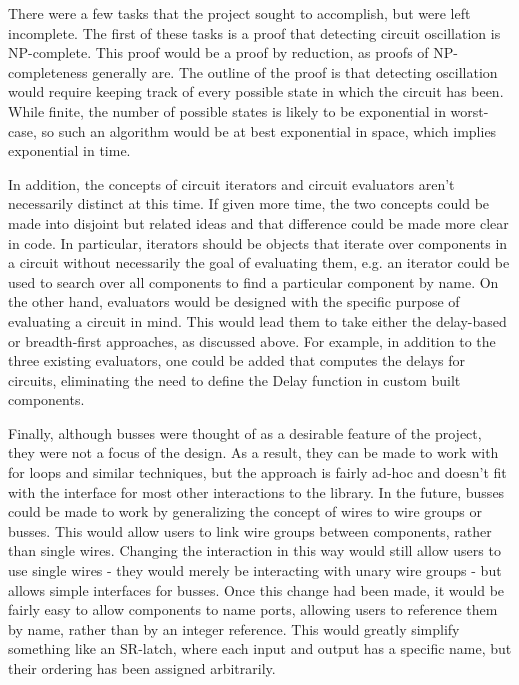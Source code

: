 \documentclass{article}
\begin{document}
There were a few tasks that the project sought to accomplish, but were left incomplete. The first of these tasks is a proof that detecting circuit oscillation is NP-complete. This proof would be a proof by reduction, as proofs of NP-completeness generally are. The outline of the proof is that detecting oscillation would require keeping track of every possible state in which the circuit has been. While finite, the number of possible states is likely to be exponential in worst-case, so such an algorithm would be at best exponential in space, which implies exponential in time.

In addition, the concepts of circuit iterators and circuit evaluators aren’t necessarily distinct at this time. If given more time, the two concepts could be made into disjoint but related ideas and that difference could be made more clear in code. In particular, iterators should be objects that iterate over components in a circuit without necessarily the goal of evaluating them, e.g. an iterator could be used to search over all components to find a particular component by name. On the other hand, evaluators would be designed with the specific purpose of evaluating a circuit in mind. This would lead them to take either the delay-based or breadth-first approaches, as discussed above. For example, in addition to the three existing evaluators, one could be added that computes the delays for circuits, eliminating the need to define the Delay function in custom built components.

Finally, although busses were thought of as a desirable feature of the project, they were not a focus of the design. As a result, they can be made to work with for loops and similar techniques, but the approach is fairly ad-hoc and doesn’t fit with the interface for most other interactions to the library. In the future, busses could be made to work by generalizing the concept of wires to wire groups or busses. This would allow users to link wire groups between components, rather than single wires. Changing the interaction in this way would still allow users to use single wires - they would merely be interacting with unary wire groups - but allows simple interfaces for busses. Once this change had been made, it would be fairly easy to allow components to name ports, allowing users to reference them by name, rather than by an integer reference. This would greatly simplify something like an SR-latch, where each input and output has a specific name, but their ordering has been assigned arbitrarily.



\end{document}
